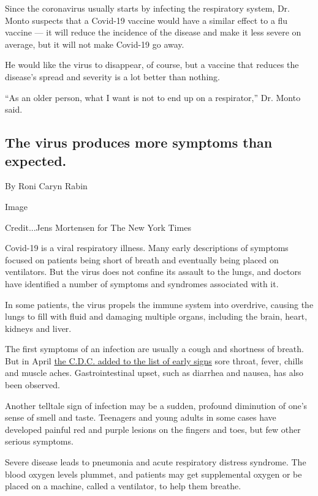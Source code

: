 Since the coronavirus usually starts by infecting the respiratory
system, Dr. Monto suspects that a Covid-19 vaccine would have a similar
effect to a flu vaccine --- it will reduce the incidence of the disease
and make it less severe on average, but it will not make Covid-19 go
away.

He would like the virus to disappear, of course, but a vaccine that
reduces the disease's spread and severity is a lot better than nothing.

``As an older person, what I want is not to end up on a respirator,''
Dr. Monto said.

\hypertarget{the-virus-produces-more-symptoms-than-expected}{%
\subsection{The virus produces more symptoms than
expected.}\label{the-virus-produces-more-symptoms-than-expected}}

By Roni Caryn Rabin

Image

Credit...Jens Mortensen for The New York Times

Covid-19 is a viral respiratory illness. Many early descriptions of
symptoms focused on patients being short of breath and eventually being
placed on ventilators. But the virus does not confine its assault to the
lungs, and doctors have identified a number of symptoms and syndromes
associated with it.

In some patients, the virus propels the immune system into overdrive,
causing the lungs to fill with fluid and damaging multiple organs,
including the brain, heart, kidneys and liver.

The first symptoms of an infection are usually a cough and shortness of
breath. But in April
\href{https://www.nytimes3xbfgragh.onion/2020/04/27/health/coronavirus-symptoms-cdc.html}{the
C.D.C. added to the list of early signs} sore throat, fever, chills and
muscle aches. Gastrointestinal upset, such as diarrhea and nausea, has
also been observed.

Another telltale sign of infection may be a sudden, profound diminution
of one's sense of smell and taste. Teenagers and young adults in some
cases have developed painful red and purple lesions on the fingers and
toes, but few other serious symptoms.

Severe disease leads to pneumonia and acute respiratory distress
syndrome. The blood oxygen levels plummet, and patients may get
supplemental oxygen or be placed on a machine, called a ventilator, to
help them breathe.

